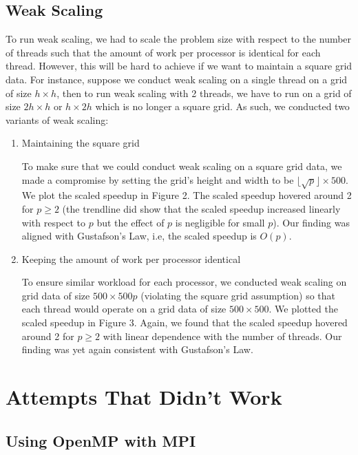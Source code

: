 \documentclass{article}
\begin{document}
\subsection{Weak Scaling}
To run weak scaling, we had to scale the problem size with respect to the number of threads such that the amount of work per processor is identical for each thread. However, this will be hard to achieve if we want to maintain a square grid data. For instance, suppose we conduct weak scaling on a single thread on a grid of size $h \times h$, then to run weak scaling with 2 threads, we have to run on a grid of size $2h \times h$ or $h \times 2h$ which is no longer a square grid. As such, we conducted two variants of weak scaling:

\begin{enumerate}
    \item Maintaining the square grid
    
    To make sure that we could conduct weak scaling on a square grid data, we made a compromise by setting the grid’s height and width to be $\lfloor \sqrt{p} \rfloor \times 500$. We plot the scaled speedup in Figure 2. The scaled speedup hovered around 2 for $p \ge 2$ (the trendline did show that the scaled speedup increased linearly with respect to $p$ but the effect of $p$ is negligible for small $p$). Our finding was aligned with Gustafson’s Law, i.e, the scaled speedup is $O(p)$.
    
    \item Keeping the amount of work per processor identical
    
    To ensure similar workload for each processor, we conducted weak scaling on grid data of size $500 \times 500p$ (violating the square grid assumption) so that each thread would operate on a grid data of size $500 \times 500$. We plotted the scaled speedup in Figure 3. Again, we found that the scaled speedup hovered around 2 for $p \ge 2$ with linear dependence with the number of threads. Our finding was yet again consistent with Gustafson’s Law.  
\end{enumerate}

\section{Attempts That Didn't Work}

\subsection{Using OpenMP with MPI}
\end{document}
